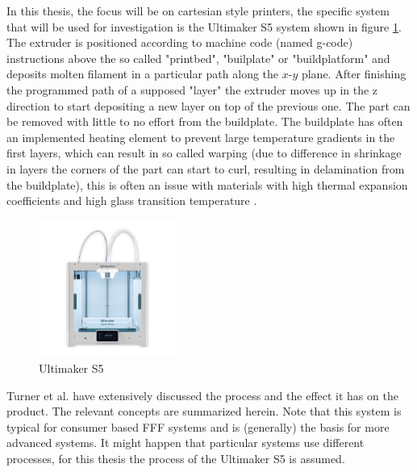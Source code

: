 In this thesis, the focus will be on cartesian style printers, the specific system that will be used for investigation is the Ultimaker S5 system \cite{Ultimaker2019UltimakerSheet} shown in figure \ref{fig:Ultimaker}. The extruder is positioned according to machine code (named g-code) instructions above the so called "printbed", "builplate" or "buildplatform" and deposits molten filament in a particular path along the $x$-$y$ plane. After finishing the programmed path of a supposed "layer" the extruder moves up in the z direction to start depositing a new layer on top of the previous one. The part can be removed with little to no effort from the buildplate. The buildplate has often an implemented heating element to prevent large temperature gradients in the first layers, which can result in so called warping (due to difference in shrinkage in layers the corners of the part can start to curl, resulting in delamination from the buildplate), this is often an issue with materials with high thermal expansion coefficients and high glass transition temperature \cite{Turner2014AModeling}. 

\begin{figure}[H]
    \centering
    \includegraphics[width=0.40\textwidth]{chapter_2/figures/UltimakerS5.png}
    \caption{Ultimaker S5 \cite{Ultimaker2019UltimakerSheet}}
    \label{fig:Ultimaker}
\end{figure}

Turner et al.\cite{Turner2014AModeling} have extensively discussed the process and the effect it has on the product. The relevant concepts are summarized herein. Note that this system is typical for consumer based FFF systems and is (generally) the basis for more advanced systems. It might happen that particular systems use different processes, for this thesis the process of the Ultimaker S5 is assumed.

